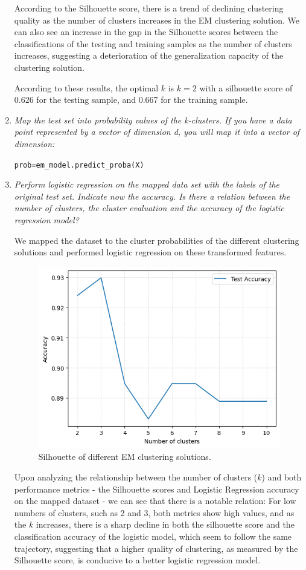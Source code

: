 \documentclass{article}
\begin{document}
\begin{enumerate}
According to the Silhouette score, there is a trend of declining clustering
quality as the number of clusters increases in the EM clustering solution.
We can also see an increase in the gap in the Silhouette scores
between the classifications of the testing and training samples as the number
of clusters increases, suggesting a deterioration of the generalization
capacity of the clustering solution.

According to these results, the optimal $k$ is $k=2$ with a silhouette score
of 0.626 for the testing sample, and 0.667 for the training sample.

  \item \textit{Map the test set into probability values of the k-clusters. If you have a data point represented
  by a vector of dimension d, you will map it into a vector of dimension:}

  \centering \texttt{prob=em\_model.predict\_proba(X)}

  \raggedright 

  \item \textit{Perform logistic regression on the mapped data set with the labels of the original test set.
  Indicate now the accuracy. Is there a relation between the number of clusters, the cluster
  evaluation and the accuracy of the logistic regression model?}

We mapped the dataset to the cluster probabilities of the different clustering 
solutions and performed logistic regression on these transformed features.

\begin{figure}[H]
  \centering
  \includegraphics[width=0.5\linewidth]{img/EMProbMapAccuracy.png}
  \caption{Silhouette of different EM clustering solutions.}
  \label{fig:em-accuracy}
\end{figure}

Upon analyzing the relationship between the number of clusters 
($k$) and both performance metrics - the Silhouette scores and
Logistic Regression accuracy on the mapped dataset - we can see
that there is a notable relation: For low numbers of clusters,
such as 2 and 3, both metrics show high values, and as the $k$
increases, there is a sharp decline in both the silhouette score
and the classification accuracy of the logistic model, which
seem to follow the same trajectory, suggesting that a higher
quality of clustering, as measured by the Silhouette score, is
conducive to a better logistic regression model.


\end{enumerate}
\end{document}
